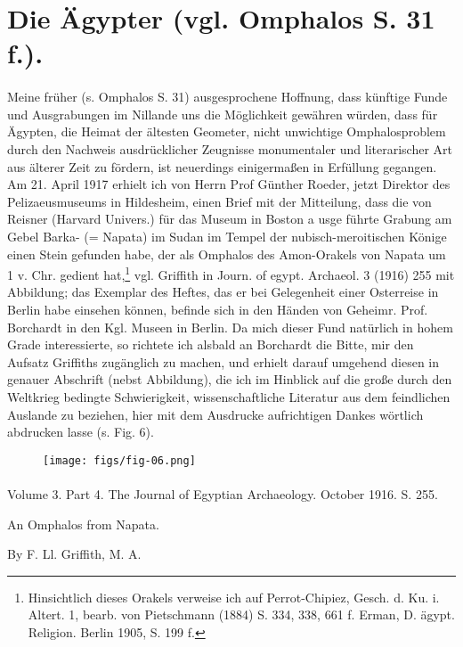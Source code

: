 \documentclass[a4paper, 11pt, oneside]{article}
\begin{document}
\section{Die Ägypter (vgl. Omphalos S. 31 f.).}
\paragraph{}
Meine früher (s. Omphalos S. 31) ausgesprochene Hoffnung, dass künftige Funde und Ausgrabungen im Nillande uns die Möglichkeit gewähren würden, dass für Ägypten, die Heimat der ältesten Geometer, nicht unwichtige Omphalosproblem durch den Nachweis ausdrücklicher Zeugnisse monumentaler und literarischer Art aus älterer Zeit zu fördern, ist neuerdings einigermaßen in Erfüllung gegangen. Am 21. April 1917 erhielt ich von Herrn Prof Günther Roeder, jetzt Direktor des Pelizaeusmuseums in Hildesheim, einen Brief mit der Mitteilung, dass die von Reisner (Harvard Univers.) für das Museum in Boston a usge führte Grabung am Gebel Barka- (= Napata) im Sudan im Tempel der nubisch-meroitischen Könige einen Stein gefunden habe, der als Omphalos des Amon-Orakels von Napata um 1 v. Chr. gedient hat,\footnote{Hinsichtlich dieses Orakels verweise ich auf Perrot-Chipiez, Gesch. d. Ku. i. Altert. 1, bearb. von Pietschmann (1884) S. 334, 338, 661 f. Erman, D. ägypt. Religion. Berlin 1905, S. 199 f.} vgl. Griffith in Journ. of egypt. Archaeol. 3 (1916) 255 mit Abbildung; das Exemplar des Heftes, das er bei Gelegenheit einer Osterreise in Berlin habe einsehen können, befinde sich in den Händen von Geheimr. Prof. Borchardt in den Kgl. Museen in Berlin. Da mich dieser Fund natürlich in hohem Grade interessierte, so richtete ich alsbald an Borchardt die Bitte, mir den Aufsatz Griffiths zugänglich zu machen, und erhielt darauf umgehend diesen in genauer Abschrift (nebst Abbildung), die ich im Hinblick auf die große durch den Weltkrieg bedingte Schwierigkeit, wissenschaftliche Literatur aus dem feindlichen Auslande zu beziehen, hier mit dem Ausdrucke aufrichtigen Dankes wörtlich abdrucken lasse (s. Fig. 6).

\begin{figure}[H]
\centering
\texttt{[image: figs/fig-06.png]}
\caption{}
\end{figure}
\paragraph{}
\begin{center}
Volume 3. Part 4. The Journal of Egyptian Archaeology. October 1916. S. 255.

An Omphalos from Napata.

By F. Ll. Griffith, M. A.
\end{center}
\end{document}
